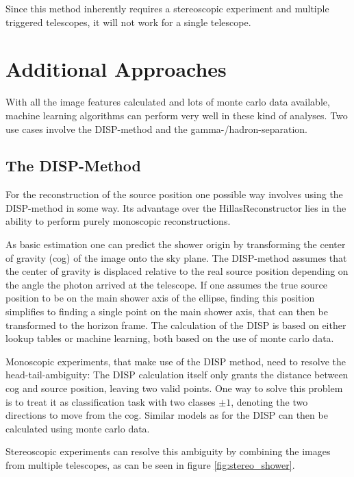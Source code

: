 Since this method inherently requires a stereoscopic experiment
and multiple triggered telescopes, it will not work for a single telescope.




\section{Additional Approaches}
With all the image features calculated and lots of monte carlo
data available, machine learning algorithms can perform
very well in these kind of analyses.
Two use cases involve the DISP-method
and the gamma-/hadron-separation.

\subsection{The DISP-Method}
For the reconstruction of the source position
one possible way involves using the DISP-method in some way.
Its advantage over the HillasReconstructor lies in the ability to
perform purely monoscopic reconstructions.

As basic estimation one can predict the shower origin by 
transforming the center of gravity (cog) of the image onto the sky plane.
The DISP-method assumes that the 
center of gravity is displaced relative to the
real source position depending on the angle the photon arrived at the telescope.
If one assumes the true source position to be on the main shower axis of the ellipse,
finding this position simplifies to finding a single point on the main shower axis, that 
can then be transformed to the horizon frame.
The calculation of the DISP is based on either lookup tables or machine learning,
both based on the use of monte carlo data.

Monoscopic experiments, that make use of the DISP method, need to resolve the head-tail-ambiguity:
The DISP calculation itself only grants the distance between
cog and source position, leaving two valid points.
One way to solve this problem is to treat it as classification task with two
classes $\pm1$, denoting the two directions to move from the cog.
Similar models as for the DISP can then be calculated using monte carlo data.

Stereoscopic experiments can resolve this ambiguity by combining the images from 
multiple telescopes, as can be seen in figure \ref{fig:stereo_shower}.

